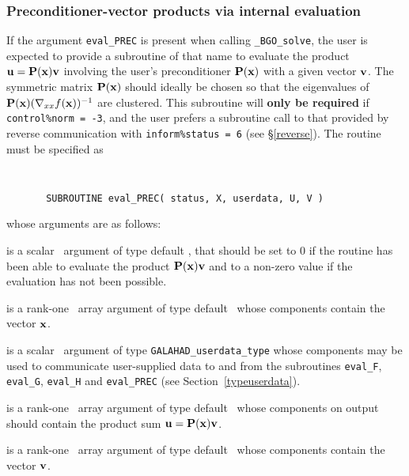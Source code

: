 \documentclass{galahad}
\newcommand{\packagename}{BGO}
\newcommand{\fullpackagename}{\libraryname\_\packagename}
\newcommand{\solver}{{\tt \fullpackagename\_solve}}
\begin{document}

\subsubsection{Preconditioner-vector products via internal evaluation\label{pv}}

If the argument {\tt eval\_PREC} is present when calling \solver, the
user is expected to provide a subroutine of that name to evaluate the
product ${\mathbf{u}} = {\mathbf{P}}({\mathbf{x}}) {\mathbf{v}}$ involving the user's preconditioner
${\mathbf{P}}({\mathbf{x}})$ with a given vector ${\mathbf{v}}$. The symmetric matrix ${\mathbf{P}}({\mathbf{x}})$
should ideally be chosen so that the eigenvalues of
${\mathbf{P}}({\mathbf{x}}) (\nabla_{xx} f({\mathbf{x}}))^{-1}$ are clustered. This subroutine
will {\bf only be required} if {\tt control\%norm = -3}, and the user prefers
a subroutine call to that provided by reverse communication 
with {\tt inform\%status = 6} (see \S\ref{reverse}).
The routine must be specified as

\def\baselinestretch{0.8}
{\tt
\begin{verbatim}
       SUBROUTINE eval_PREC( status, X, userdata, U, V )
\end{verbatim} }
\def\baselinestretch{1.0}
\noindent whose arguments are as follows:

\begin{description}
 is a scalar \intentout\ argument of type default \integer,
that should be set to 0 if the routine has been able to evaluate the
product ${\mathbf{P}}({\mathbf{x}}) {\mathbf{v}}$
and to a non-zero value if the evaluation has not been possible.

 is a rank-one \intentin\ array argument of type default \realdp\
whose components contain the vector ${\mathbf{x}}$.

 is a scalar \intentinout\ argument of type
{\tt GALAHAD\_userdata\_type} whose components may be used
to communicate user-supplied data to and from the
subroutines {\tt eval\_F}, {\tt eval\_G},
{\tt eval\_H} and {\tt eval\_PREC}
(see Section~\ref{typeuserdata}).

 is a rank-one \intentout\ array argument of type default \realdp\
whose components on output should contain the product
sum ${\mathbf{u}} = {\mathbf{P}}({\mathbf{x}}) {\mathbf{v}}$.

 is a rank-one \intentin\ array argument of type default \realdp\
whose components contain the vector ${\mathbf{v}}$.

\end{description}
\end{document}
